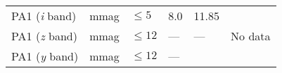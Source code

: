 \documentclass[DM,toc]{lsstdoc}
\begin{document}
\begin{longtable}[]{@{}llllll@{}}
\begin{minipage}[t]{0.14\columnwidth}
PA1 (\emph{i} band)\strut
\end{minipage} & \begin{minipage}[t]{0.06\columnwidth}\raggedright\strut
mmag\strut
\end{minipage} & \begin{minipage}[t]{0.17\columnwidth}\raggedright\strut
\(\leq 5\)\strut
\end{minipage} & \begin{minipage}[t]{0.17\columnwidth}\raggedright\strut
8.0\strut
\end{minipage} & \begin{minipage}[t]{0.12\columnwidth}\raggedright\strut
11.85\strut
\end{minipage} & \begin{minipage}[t]{0.17\columnwidth}\raggedright\strut
\strut
\end{minipage}\tabularnewline
\begin{minipage}[t]{0.14\columnwidth}\raggedright\strut
PA1 (\emph{z} band)\strut
\end{minipage} & \begin{minipage}[t]{0.06\columnwidth}\raggedright\strut
mmag\strut
\end{minipage} & \begin{minipage}[t]{0.17\columnwidth}\raggedright\strut
\(\leq 12\)\strut
\end{minipage} & \begin{minipage}[t]{0.17\columnwidth}\raggedright\strut
---\strut
\end{minipage} & \begin{minipage}[t]{0.12\columnwidth}\raggedright\strut
---\strut
\end{minipage} & \begin{minipage}[t]{0.17\columnwidth}\raggedright\strut
No data\strut
\end{minipage}\tabularnewline
\begin{minipage}[t]{0.14\columnwidth}\raggedright\strut
PA1 (\emph{y} band)\strut
\end{minipage} & \begin{minipage}[t]{0.06\columnwidth}\raggedright\strut
mmag\strut
\end{minipage} & \begin{minipage}[t]{0.17\columnwidth}\raggedright\strut
\(\leq 12\)\strut
\end{minipage} & \begin{minipage}[t]{0.17\columnwidth}\raggedright\strut
---\strut
\end{minipage} & \begin{minipage}[t]{0.12\columnwidth}\raggedright\strut

\end{minipage}
\end{longtable}
\end{document}
